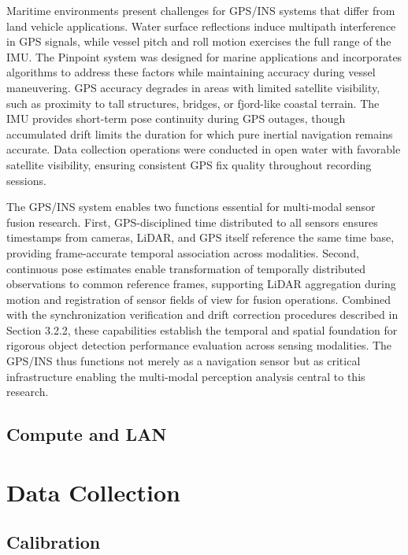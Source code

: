 \documentclass{erauthesis}
\begin{document}
Maritime environments present challenges for \ac{GPS}/\ac{INS} systems that differ from land vehicle applications.
Water surface reflections induce multipath interference in \ac{GPS} signals, while vessel pitch and roll motion exercises the full range of the \ac{IMU}.
The Pinpoint system was designed for marine applications and incorporates algorithms to address these factors while maintaining accuracy during vessel maneuvering.
\ac{GPS} accuracy degrades in areas with limited satellite visibility, such as proximity to tall structures, bridges, or fjord-like coastal terrain.
The \ac{IMU} provides short-term pose continuity during \ac{GPS} outages, though accumulated drift limits the duration for which pure inertial navigation remains accurate.
Data collection operations were conducted in open water with favorable satellite visibility, ensuring consistent \ac{GPS} fix quality throughout recording sessions.

The \ac{GPS}/\ac{INS} system enables two functions essential for multi-modal sensor fusion research.
First, \ac{GPS}-disciplined time distributed to all sensors ensures timestamps from cameras, \ac{LiDAR}, and \ac{GPS} itself reference the same time base, providing frame-accurate temporal association across modalities.
Second, continuous pose estimates enable transformation of temporally distributed observations to common reference frames, supporting \ac{LiDAR} aggregation during motion and registration of sensor fields of view for fusion operations.
Combined with the synchronization verification and drift correction procedures described in Section 3.2.2, these capabilities establish the temporal and spatial foundation for rigorous object detection performance evaluation across sensing modalities.
The \ac{GPS}/\ac{INS} thus functions not merely as a navigation sensor but as critical infrastructure enabling the multi-modal perception analysis central to this research.

        \subsection{Compute and LAN}
        
    \section{Data Collection}
    
        \subsection{Calibration}
        
\end{document}
